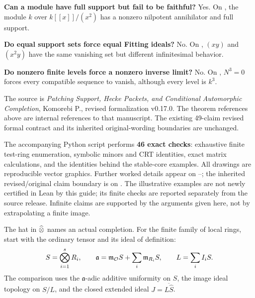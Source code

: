 \textbf{Can a module have full support but fail to be faithful?} Yes. On , the module $k$ over $k[[x]]/(x^2)$ has a nonzero nilpotent annihilator and full support.

\textbf{Do equal support sets force equal Fitting ideals?} No. On , $(xy)$ and $(x^2y)$ have the same vanishing set but different infinitesimal behavior.

\textbf{Do nonzero finite levels force a nonzero inverse limit?} No. On , $N^3=0$ forces every compatible sequence to vanish, although every level is $k^3$.

The source is \emph{Patching Support, Hecke Packets, and Conditional Automorphic Completion}, Komorebi P., revised formalization v0.17.0. The theorem references above are internal references to that manuscript. The existing 49-claim revised formal contract and its inherited original-wording boundaries are unchanged.

The accompanying Python script performs \textbf{46 exact checks}: exhaustive finite test-ring enumeration, symbolic minors and CRT identities, exact matrix calculations, and the identities behind the stable-core examples. All drawings are reproducible vector graphics. Further worked details appear on --; the inherited revised/original claim boundary is on . The illustrative examples are not newly certified in Lean by this guide; its finite checks are reported separately from the source release. Infinite claims are supported by the arguments given here, not by extrapolating a finite image.

\setlength{\parskip}{5pt}
The hat in $\mathbin{\widehat\otimes}$ names an actual completion. For the finite family of local rings, start with the ordinary tensor and its ideal of definition:
\[
 S=\bigotimes_{i=1}^s R_i,\qquad
 \mathfrak a=\mathfrak m_{\mathcal O}S+\sum_i\mathfrak m_{R_i}S,\qquad L=\sum_i I_iS.
\]
The comparison uses the $\mathfrak a$-adic additive uniformity on $S$, the image ideal topology on $S/L$, and the closed extended ideal $J=\overline{L\widehat S}$.


